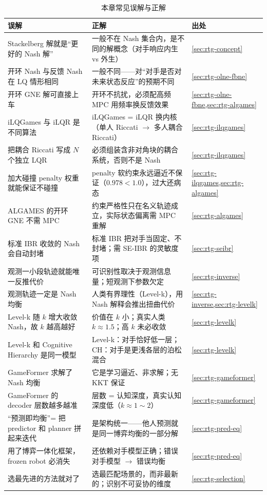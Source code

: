 \begin{table}[H]\centering\small
\caption{本章常见误解与正解}
\label{tab:rtg-misconceptions}
\begin{tabular}{p{} p{} p{}}
\toprule
误解 & 正解 & 出处 \\
\midrule
Stackelberg 解就是“更好的 Nash 解” & 一般不在 Nash 集合内，是不同的解概念（对手响应内生 vs 外生） & \cref{sec:rtg-concept} \\
开环 Nash 与反馈 Nash 在 LQ 情形相同 & 一般不同——对“对手是否对未来状态反应”的预期不同 & \cref{sec:rtg-olne-fbne} \\
开环 GNE 解可直接上车 & 开环不抗扰，必须配高频 MPC 用频率换反馈效果 & \cref{sec:rtg-olne-fbne,sec:rtg-algames} \\
iLQGames 与 iLQR 是不同算法 & iLQGames = iLQR 换内核（单人 Riccati $\to$ 多人耦合 Riccati） & \cref{sec:rtg-ilqgames} \\
把耦合 Riccati 写成 $N$ 个独立 LQR & 必须组装含非对角块的耦合系统，否则不是 Nash & \cref{sec:rtg-ilqgames} \\
加大碰撞 penalty 权重就能保证不碰撞 & penalty 软约束永远逼近不保证（$0.978<1.0$），过大还病态 & \cref{sec:rtg-ilqgames,sec:rtg-algames} \\
ALGAMES 的开环 GNE 不需 MPC & 约束严格性只在名义轨迹成立，实际状态偏离需 MPC 重解 & \cref{sec:rtg-algames} \\
标准 IBR 收敛的 Nash 会自动封堵 & 标准 IBR 把对手当固定、不封堵；需 SE-IBR 的灵敏度项 & \cref{sec:rtg-seibr} \\
观测一小段轨迹就能唯一反推代价 & 可识别性取决于观测信息量；短观测下参数欠定 & \cref{sec:rtg-inverse} \\
观测轨迹一定是 Nash 均衡 & 人类有界理性（Level-k），用 Nash 解释会推出扭曲代价 & \cref{sec:rtg-inverse,sec:rtg-levelk} \\
Level-k 随 $k$ 增大收敛 Nash，故 $k$ 越高越好 & 价值在 $k$ 小；真实人类 $k\approx1.5$；高 $k$ 未必收敛 & \cref{sec:rtg-levelk} \\
Level-k 和 Cognitive Hierarchy 是同一模型 & Level-k：对手恰好低一层；CH：对手是更浅各层的泊松混合 & \cref{sec:rtg-levelk} \\
GameFormer 求解了 Nash 均衡 & 它是学习逼近、非求解；无 KKT 保证 & \cref{sec:rtg-gameformer} \\
GameFormer 的 decoder 层数越多越准 & 层数 = 认知深度，真实认知深度低（$k\approx1\sim2$） & \cref{sec:rtg-gameformer} \\
“预测即均衡”= 把 predictor 和 planner 拼起来迭代 & 是架构统一——他人预测就是同一博弈均衡的一部分解 & \cref{sec:rtg-pred-eq} \\
用了博弈一体化框架，frozen robot 必消失 & 还依赖对手模型正确；错误对手模型 $\to$ 错误均衡 & \cref{sec:rtg-pred-eq} \\
选最先进的方法就对了 & 选最匹配场景的，而非最新的；识别不可妥协的维度 & \cref{sec:rtg-selection} \\
\bottomrule
\end{tabular}
\end{table}

